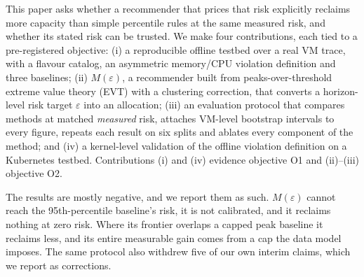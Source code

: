 \documentclass[conference]{IEEEtran}
\newcommand{\Meps}{$M(\varepsilon)$}
\begin{document}
This paper asks whether a recommender that prices that risk explicitly reclaims more capacity than simple percentile rules at the same measured risk, and whether its stated risk can be trusted. We make four contributions, each tied to a pre-registered objective: (i) a reproducible offline testbed over a real VM trace, with a flavour catalog, an asymmetric memory/CPU violation definition and three baselines; (ii) \Meps, a recommender built from peaks-over-threshold extreme value theory (EVT) with a clustering correction, that converts a horizon-level risk target $\varepsilon$ into an allocation; (iii) an evaluation protocol that compares methods at matched \emph{measured} risk, attaches VM-level bootstrap intervals to every figure, repeats each result on six splits and ablates every component of the method; and (iv) a kernel-level validation of the offline violation definition on a Kubernetes testbed. Contributions (i) and (iv) evidence objective O1 and (ii)--(iii) objective O2.

The results are mostly negative, and we report them as such. \Meps{} cannot reach the 95th-percentile baseline's risk, it is not calibrated, and it reclaims nothing at zero risk. Where its frontier overlaps a capped peak baseline it reclaims less, and its entire measurable gain comes from a cap the data model imposes. The same protocol also withdrew five of our own interim claims, which we report as corrections.

\end{document}
